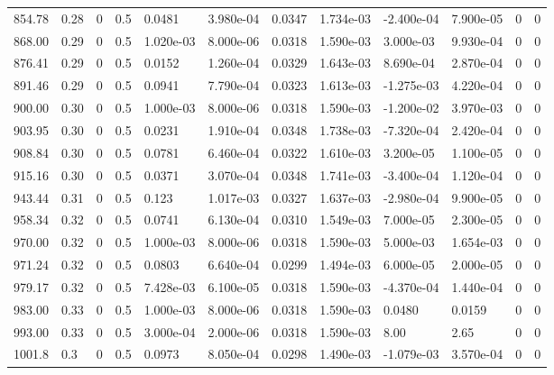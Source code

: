\documentclass[preview]{standalone}
\begin{document}
{{{\begin{tabular}{L{1.2cm}C{1.2cm} C{0.3cm}C{0.5cm} C{1.4cm}C{1.4cm} C{1.4cm}C{1.4cm} C{1.6cm}C{1.6cm} C{1.6cm}C{1.6cm}}
  854.78  &  0.28  & 0     & 0.5 &  0.0481  & 3.980e-04  &  0.0347&   1.734e-03& -2.400e-04 & 7.900e-05   &  0 & 0  \\ 
  868.00  &  0.29  & 0     & 0.5 &  1.020e-03  & 8.000e-06  &  0.0318&   1.590e-03& 3.000e-03 & 9.930e-04   &  0 & 0  \\ 
  876.41  &  0.29  & 0     & 0.5 &  0.0152  & 1.260e-04  &  0.0329&   1.643e-03& 8.690e-04 & 2.870e-04   &  0 & 0  \\ 
  891.46  &  0.29  & 0     & 0.5 &  0.0941  & 7.790e-04  &  0.0323&   1.613e-03& -1.275e-03 & 4.220e-04   &  0 & 0  \\ 
  900.00  &  0.30  & 0     & 0.5 &  1.000e-03  & 8.000e-06  &  0.0318&   1.590e-03& -1.200e-02 & 3.970e-03   &  0 & 0  \\ 
  903.95  &  0.30  & 0     & 0.5 &  0.0231  & 1.910e-04  &  0.0348&   1.738e-03& -7.320e-04 & 2.420e-04   &  0 & 0  \\ 
  908.84  &  0.30  & 0     & 0.5 &  0.0781  & 6.460e-04  &  0.0322&   1.610e-03& 3.200e-05 & 1.100e-05   &  0 & 0  \\ 
  915.16  &  0.30  & 0     & 0.5 &  0.0371  & 3.070e-04  &  0.0348&   1.741e-03& -3.400e-04 & 1.120e-04   &  0 & 0  \\ 
  943.44  &  0.31  & 0     & 0.5 &  0.123  & 1.017e-03  &  0.0327&   1.637e-03& -2.980e-04 & 9.900e-05   &  0 & 0  \\ 
  958.34  &  0.32  & 0     & 0.5 &  0.0741  & 6.130e-04  &  0.0310&   1.549e-03& 7.000e-05 & 2.300e-05   &  0 & 0  \\ 
  970.00  &  0.32  & 0     & 0.5 &  1.000e-03  & 8.000e-06  &  0.0318&   1.590e-03& 5.000e-03 & 1.654e-03   &  0 & 0  \\ 
  971.24  &  0.32  & 0     & 0.5 &  0.0803  & 6.640e-04  &  0.0299&   1.494e-03& 6.000e-05 & 2.000e-05   &  0 & 0  \\ 
  979.17  &  0.32  & 0     & 0.5 &  7.428e-03  & 6.100e-05  &  0.0318&   1.590e-03& -4.370e-04 & 1.440e-04   &  0 & 0  \\ 
  983.00  &  0.33  & 0     & 0.5 &  1.000e-03  & 8.000e-06  &  0.0318&   1.590e-03& 0.0480 & 0.0159   &  0 & 0  \\ 
  993.00  &  0.33  & 0     & 0.5 &  3.000e-04  & 2.000e-06  &  0.0318&   1.590e-03& 8.00 & 2.65   &  0 & 0  \\ 
  1001.8  &   0.3  & 0     & 0.5 &  0.0973  & 8.050e-04  &  0.0298&   1.490e-03& -1.079e-03 & 3.570e-04   &  0 & 0  \\ 
\hline 
\end{tabular} 

}}}
\end{document}

